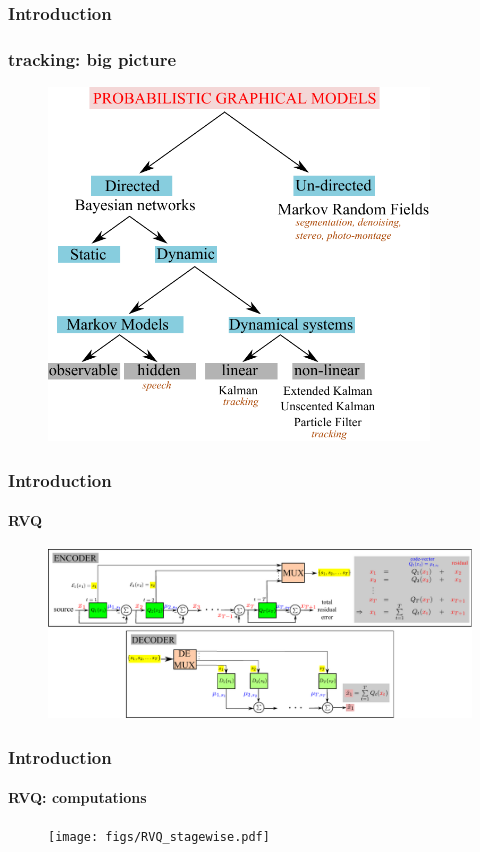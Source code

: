 \begin{frame}
\frametitle{Introduction}
\frametitle{tracking: big picture}
\logoCSIPCPL\mypagenum
	\begin{figure}
		\includegraphics[width=0.9\textwidth]{figs/PRML_PGM_overview.pdf}
	\end{figure}
\end{frame}


\begin{frame}[plain]
\frametitle{Introduction}
\framesubtitle{RVQ}
\logoCSIPCPL\mypagenum
	\begin{changemargin}{-1.3in}{0in}
		\begin{figure}				
			\includegraphics[width=1.3\textwidth]{figs/RVQ_blockDiagram.pdf}
			\label{fig:RVQ_SQ_DMSE}
		\end{figure}
	\end{changemargin}
\end{frame}


\begin{frame}[plain]
\frametitle{Introduction}
\framesubtitle{RVQ: computations}
\logoCSIPCPL\mypagenum
	\begin{changemargin}{-1.3in}{0in}
		\begin{figure}				
			\texttt{[image: figs/RVQ\_stagewise.pdf]}
			\label{fig:RVQ_SQ_DMSE}
		\end{figure}
	\end{changemargin}
\end{frame}

